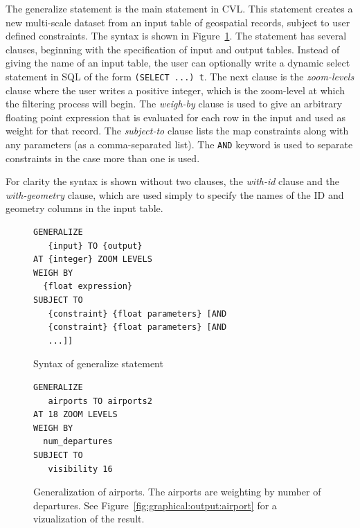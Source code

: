 The generalize statement is the main statement in CVL. This statement creates a new multi-scale dataset from an input table of geospatial records, subject to user defined constraints. The syntax is shown in Figure~\ref{fig:generalize:syntax}. The statement has several clauses, beginning with the specification of input and output tables. Instead of giving the name of an input table, the user can optionally write a dynamic select statement in SQL of the form \texttt{(SELECT ...) t}. The next clause is the \emph{zoom-levels} clause where the user writes a positive integer, which is the zoom-level  at which the filtering process will begin. The \emph{weigh-by} clause is used to give an arbitrary floating point expression that is evaluated for each row in the input and used as weight for that record. The \emph{subject-to} clause lists the map constraints along with any parameters (as a comma-separated list). The \texttt{AND} keyword is used to separate constraints in the case more than one is used.

For clarity the syntax is shown without two clauses, the \emph{with-id} clause and the \emph{with-geometry} clause, which are used simply to specify the names of the ID and geometry columns in the input table.

\begin{figure}[htbp]
\begin{center}
\begin{lstlisting}
GENERALIZE 
   {input} TO {output}
AT {integer} ZOOM LEVELS
WEIGH BY
  {float expression}
SUBJECT TO 
   {constraint} {float parameters} [AND
   {constraint} {float parameters} [AND
   ...]]
\end{lstlisting}
\caption{Syntax of generalize statement}
\label{fig:generalize:syntax}
\end{center}
\end{figure}

\begin{figure}[htbp]
\begin{center}
\begin{lstlisting}
GENERALIZE 
   airports TO airports2
AT 18 ZOOM LEVELS
WEIGH BY
  num_departures
SUBJECT TO 
   visibility 16 
\end{lstlisting}
\caption{Generalization of airports. The airports are weighting by number of departures. See Figure~\ref{fig:graphical:output:airport} for a vizualization of the result.}
\label{fig:cvl:example:airports}
\end{center}
\end{figure}

